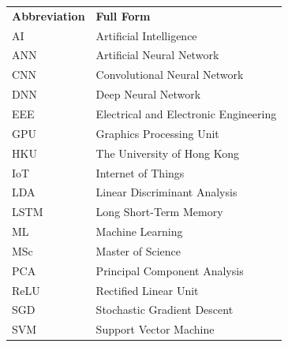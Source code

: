 
\begin{singlespace}
\begin{longtable}{ll}
\textbf{Abbreviation} & \textbf{Full Form} \\[0.5em]
AI   & Artificial Intelligence \\
ANN  & Artificial Neural Network \\
CNN  & Convolutional Neural Network \\
DNN  & Deep Neural Network \\
EEE  & Electrical and Electronic Engineering \\
GPU  & Graphics Processing Unit \\
HKU  & The University of Hong Kong \\
IoT  & Internet of Things \\
LDA  & Linear Discriminant Analysis \\
LSTM & Long Short-Term Memory \\
ML   & Machine Learning \\
MSc  & Master of Science \\
PCA  & Principal Component Analysis \\
ReLU & Rectified Linear Unit \\
SGD  & Stochastic Gradient Descent \\
SVM  & Support Vector Machine \\
\end{longtable}
\end{singlespace}
\clearpage
